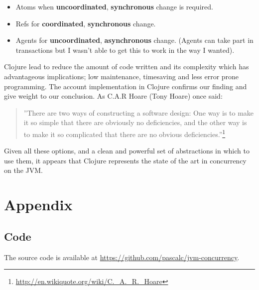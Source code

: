 \documentclass[a4paper,12pt]{kth-mag}
\begin{document}
\begin{itemize}
\item Atoms when \textbf{uncoordinated}, \textbf{synchronous} change is required.
\item Refs for \textbf{coordinated}, \textbf{synchronous} change.
\item Agents for \textbf{uncoordinated}, \textbf{asynchronous} change. (Agents can take part in transactions but I wasn't able to get this to work in the way I wanted).
\end{itemize}

Clojure lead to reduce the amount of code written and its complexity which has advantageous implications; low maintenance, timesaving and less error prone programming. The account implementation in Clojure confirms our finding and give weight to our conclusion. As C.A.R Hoare (Tony Hoare) once said:
\begin{quote}
''There are two ways of constructing a software design: One way is to make it so simple that there are obviously no deficiencies, and the other way is to make it so complicated that there are no obvious deficiencies.''\footnote{\url{http://en.wikiquote.org/wiki/C._A._R._Hoare}}
\end{quote}

Given all these options, and a clean and powerful set of abstractions in which to use them, it appears that Clojure represents the state of the art in concurrency on the JVM. 

\appendix
\addappheadtotoc
\chapter{Appendix}

\section*{Code}
The source code is available at \url{https://github.com/pascalc/jvm-concurrency}.




\cite{FH11}
\end{document}
